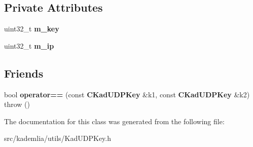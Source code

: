\subsection*{Private Attributes}
\begin{DoxyCompactItemize}
\item 
uint32\_\-t {\bfseries m\_\-key}\label{classKademlia_1_1CKadUDPKey_a5986308f144e15d67c7cf8238e3028c2}

\item 
uint32\_\-t {\bfseries m\_\-ip}\label{classKademlia_1_1CKadUDPKey_aadb970ba385ac0df4d0323d0ab0c472d}

\end{DoxyCompactItemize}
\subsection*{Friends}
\begin{DoxyCompactItemize}
\item 
bool {\bfseries operator==} (const {\bf CKadUDPKey} \&k1, const {\bf CKadUDPKey} \&k2)  throw ()\label{classKademlia_1_1CKadUDPKey_ab668492667c5e7926d6cab2c9ca7ff20}

\end{DoxyCompactItemize}


The documentation for this class was generated from the following file:\begin{DoxyCompactItemize}
\item 
src/kademlia/utils/KadUDPKey.h\end{DoxyCompactItemize}
